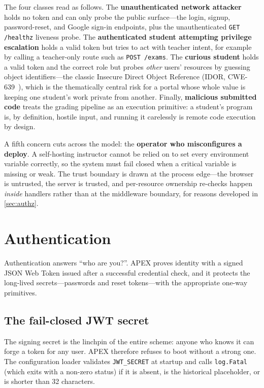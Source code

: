 The four classes read as follows. The \textbf{unauthenticated network
attacker} holds no token and can only probe the public surface---the login,
signup, password-reset, and Google sign-in endpoints, plus the unauthenticated
\texttt{GET /healthz} liveness probe. The \textbf{authenticated student
attempting privilege escalation} holds a valid token but tries to act with
teacher intent, for example by calling a teacher-only route such as
\texttt{POST /exams}. The \textbf{curious student} holds a valid token and the
correct role but probes \emph{other} users' resources by guessing object
identifiers---the classic Insecure Direct Object Reference (IDOR,
CWE-639~\cite{cwe-639}), which is the thematically central risk for a portal
whose whole value is keeping one student's work private from another. Finally,
\textbf{malicious submitted code} treats the grading pipeline as an execution
primitive: a student's program is, by definition, hostile input, and running it
carelessly is remote code execution by design.

A fifth concern cuts across the model: the \textbf{operator who misconfigures a
deploy}. A self-hosting instructor cannot be relied on to set every environment
variable correctly, so the system must fail closed when a critical variable is
missing or weak. The trust boundary is drawn at the process edge---the browser
is untrusted, the server is trusted, and per-resource ownership re-checks happen
\emph{inside} handlers rather than at the middleware boundary, for reasons
developed in \cref{sec:authz}.

\section{Authentication}
\label{sec:authn}

Authentication answers ``who are you?''. APEX proves identity with a signed JSON
Web Token issued after a successful credential check, and it protects the
long-lived secrets---passwords and reset tokens---with the appropriate
one-way primitives.

\subsection{The fail-closed JWT secret}
\label{sec:jwt-secret}

The signing secret is the linchpin of the entire scheme: anyone who knows it can
forge a token for any user. APEX therefore refuses to boot without a strong one.
The configuration loader validates \texttt{JWT\_SECRET} at startup and calls
\texttt{log.Fatal} (which exits with a non-zero status) if it is absent, is the
historical placeholder, or is shorter than 32 characters.

